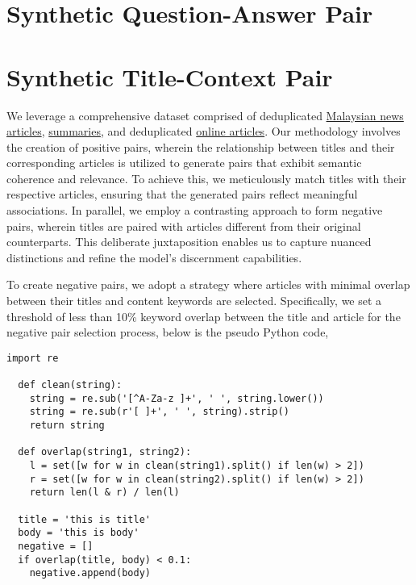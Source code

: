 \documentclass[preprint]{article}
\begin{document}
\section{Synthetic Question-Answer Pair}

\section{Synthetic Title-Context Pair}

We leverage a comprehensive dataset comprised of deduplicated \href{https://huggingface.co/datasets/malaysia-ai/dedup-text-dataset}{Malaysian news articles}, \href{https://huggingface.co/datasets/mesolitica/mixtral-malaysian-abstractive-summarization}{summaries}, and deduplicated \href{https://huggingface.co/datasets/malaysia-ai/dedup-text-dataset}{online articles}. Our methodology involves the creation of positive pairs, wherein the relationship between titles and their corresponding articles is utilized to generate pairs that exhibit semantic coherence and relevance. To achieve this, we meticulously match titles with their respective articles, ensuring that the generated pairs reflect meaningful associations. In parallel, we employ a contrasting approach to form negative pairs, wherein titles are paired with articles different from their original counterparts. This deliberate juxtaposition enables us to capture nuanced distinctions and refine the model's discernment capabilities.

To create negative pairs, we adopt a strategy where articles with minimal overlap between their titles and content keywords are selected. Specifically, we set a threshold of less than 10\% keyword overlap between the title and article for the negative pair selection process, below is the pseudo Python code,

\begin{lstlisting}[breaklines=true]
  import re

  def clean(string):
    string = re.sub('[^A-Za-z ]+', ' ', string.lower())
    string = re.sub(r'[ ]+', ' ', string).strip()
    return string

  def overlap(string1, string2):
    l = set([w for w in clean(string1).split() if len(w) > 2])
    r = set([w for w in clean(string2).split() if len(w) > 2])
    return len(l & r) / len(l)

  title = 'this is title'
  body = 'this is body'
  negative = []
  if overlap(title, body) < 0.1:
    negative.append(body)
\end{lstlisting}
\end{document}
